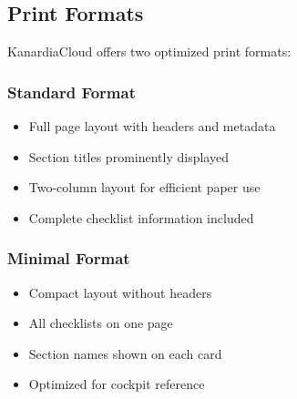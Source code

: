 \subsection{Print Formats}

KanardiaCloud offers two optimized print formats:

\subsubsection{Standard Format}
\begin{itemize}
    \item Full page layout with headers and metadata
    \item Section titles prominently displayed
    \item Two-column layout for efficient paper use
    \item Complete checklist information included
\end{itemize}

\subsubsection{Minimal Format}
\begin{itemize}
    \item Compact layout without headers
    \item All checklists on one page
    \item Section names shown on each card
    \item Optimized for cockpit reference
\end{itemize}

